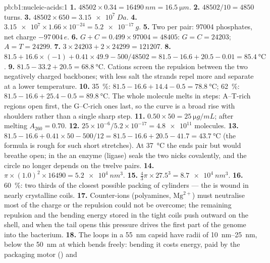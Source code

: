 \begin{solution}{pb:b1:nucleic-acids:1}
\textbf{1.} $\num{48502}\times 0.34 = \qty{16490}{nm} = \qty{16.5}{\micro m}$.
\textbf{2.} $\num{48502}/10 = 4850$ turns.
\textbf{3.} $\num{48502}\times 650 = \qty{3.15e7}{Da}$.
\textbf{4.} $\num{3.15e7}\times 1.66\times 10^{-24} = \qty{5.2e-17}{g}$.
\textbf{5.} Two per pair: \num{97004} phosphates, net charge $-97\,004\,e$.
\textbf{6.} $G + C = 0.499\times\num{97004} = \num{48405}$: $G = C =
\num{24203}$; $A = T = \num{24299}$.
\textbf{7.} $3\times\num{24203} + 2\times\num{24299} = \num{121207}$.
\textbf{8.} $81.5 + 16.6\times(-1) + 0.41\times 49.9 - 500/48502 =
81.5 - 16.6 + 20.5 - 0.01 = \qty{85.4}{\celsius}$.
\textbf{9.} $81.5 - 33.2 + 20.5 = \qty{68.8}{\celsius}$. Cations screen
the repulsion between the two negatively charged backbones; with less
salt the strands repel more and separate at a lower temperature.
\textbf{10.} \qty{35}{\%}: $81.5 - 16.6 + 14.4 - 0.5 =
\qty{78.8}{\celsius}$; \qty{62}{\%}: $81.5 - 16.6 + 25.4 - 0.5 =
\qty{89.8}{\celsius}$. The whole molecule melts in steps: A--T-rich
regions open first, the G--C-rich ones last, so the curve is a broad
rise with shoulders rather than a single sharp step.
\textbf{11.} $0.50\times 50 = \qty{25}{\micro g/mL}$; after melting
$A_{260} = 0.70$.
\textbf{12.} $25\times 10^{-6}/5.2\times 10^{-17} = \num{4.8e11}$ molecules.
\textbf{13.} $81.5 - 16.6 + 0.41\times 50 - 500/12 = 81.5 - 16.6 + 20.5
- 41.7 = \qty{43.7}{\celsius}$ (the formula is rough for such short
stretches). At \qty{37}{\celsius} the ends pair but would breathe open;
in the  an enzyme (ligase) seals the two nicks covalently, and the
circle no longer depends on the twelve pairs.
\textbf{14.} $\pi\times(1.0)^2\times\num{16490} = \qty{5.2e4}{nm^3}$.
\textbf{15.} $\frac{4}{3}\pi\times 27.5^3 = \qty{8.7e4}{nm^3}$.
\textbf{16.} \qty{60}{\%}: two thirds of the closest possible packing
of cylinders --- the  is wound in nearly crystalline coils.
\textbf{17.} Counter-ions (polyamines, $\mathrm{Mg^{2+}}$) must
neutralise most of the charge or the repulsion could not be overcome;
the remaining repulsion and the bending energy stored in the tight
coils push outward on the shell, and when the tail opens this pressure
drives the first part of the genome into the bacterium.
\textbf{18.} The loops in a \qty{55}{nm} capsid have radii of
\qtyrange{10}{25}{nm}, below the \qty{50}{nm} at which  bends
freely: bending it costs energy, paid by the packaging motor () and

\end{solution}
